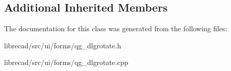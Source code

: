 \subsection*{Additional Inherited Members}


The documentation for this class was generated from the following files\-:\begin{DoxyCompactItemize}
\item 
librecad/src/ui/forms/qg\-\_\-dlgrotate.\-h\item 
librecad/src/ui/forms/qg\-\_\-dlgrotate.\-cpp\end{DoxyCompactItemize}
